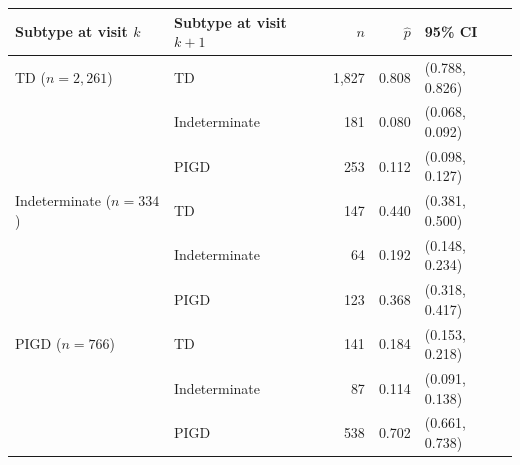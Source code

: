 \begin{tabular}{@{}llrrl@{}}
\toprule
Subtype at visit $k$ & Subtype at visit $k+1$ & $n$ & $\hat{p}$ & 95\% CI \\
\midrule
TD ($n{=}2{,}261$) & TD & 1,827 & 0.808 & (0.788, 0.826) \\
 & Indeterminate & 181 & 0.080 & (0.068, 0.092) \\
 & PIGD & 253 & 0.112 & (0.098, 0.127) \\
\addlinespace[2pt]
Indeterminate ($n{=}334$) & TD & 147 & 0.440 & (0.381, 0.500) \\
 & Indeterminate & 64 & 0.192 & (0.148, 0.234) \\
 & PIGD & 123 & 0.368 & (0.318, 0.417) \\
\addlinespace[2pt]
PIGD ($n{=}766$) & TD & 141 & 0.184 & (0.153, 0.218) \\
 & Indeterminate & 87 & 0.114 & (0.091, 0.138) \\
 & PIGD & 538 & 0.702 & (0.661, 0.738) \\
\bottomrule
\end{tabular}
